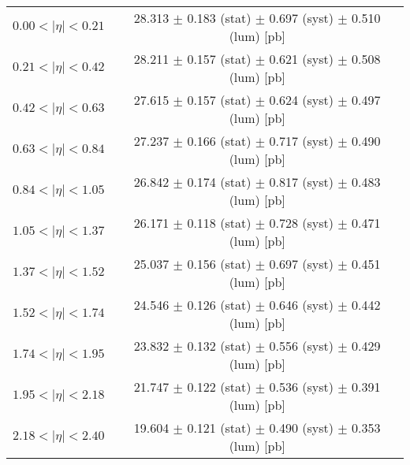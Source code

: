 \begin{tabular}{lc}
\hline
$0.00 < |\eta| <0.21$          & 28.313 $\pm$ 0.183 (stat) $\pm$ 0.697 (syst) $\pm$ 0.510 (lum) [pb]  \\
$0.21 < |\eta| <0.42$          & 28.211 $\pm$ 0.157 (stat) $\pm$ 0.621 (syst) $\pm$ 0.508 (lum) [pb]  \\
$0.42 < |\eta| <0.63$          & 27.615 $\pm$ 0.157 (stat) $\pm$ 0.624 (syst) $\pm$ 0.497 (lum) [pb]  \\
$0.63 < |\eta| <0.84$          & 27.237 $\pm$ 0.166 (stat) $\pm$ 0.717 (syst) $\pm$ 0.490 (lum) [pb]  \\
$0.84 < |\eta| <1.05$          & 26.842 $\pm$ 0.174 (stat) $\pm$ 0.817 (syst) $\pm$ 0.483 (lum) [pb]  \\
$1.05 < |\eta| <1.37$          & 26.171 $\pm$ 0.118 (stat) $\pm$ 0.728 (syst) $\pm$ 0.471 (lum) [pb]  \\
$1.37 < |\eta| <1.52$          & 25.037 $\pm$ 0.156 (stat) $\pm$ 0.697 (syst) $\pm$ 0.451 (lum) [pb]  \\
$1.52 < |\eta| <1.74$          & 24.546 $\pm$ 0.126 (stat) $\pm$ 0.646 (syst) $\pm$ 0.442 (lum) [pb]  \\
$1.74 < |\eta| <1.95$          & 23.832 $\pm$ 0.132 (stat) $\pm$ 0.556 (syst) $\pm$ 0.429 (lum) [pb]  \\
$1.95 < |\eta| <2.18$          & 21.747 $\pm$ 0.122 (stat) $\pm$ 0.536 (syst) $\pm$ 0.391 (lum) [pb]  \\
$2.18 < |\eta| <2.40$          & 19.604 $\pm$ 0.121 (stat) $\pm$ 0.490 (syst) $\pm$ 0.353 (lum) [pb]  \\
\hline
\end{tabular}
